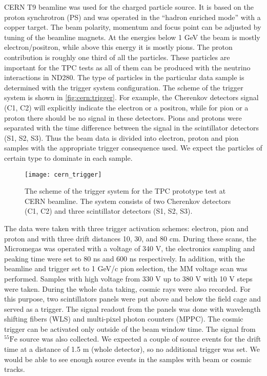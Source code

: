 \documentclass[../main.tex]{subfiles}
\begin{document}
CERN T9 beamline was used for the charged particle source. It is based on the proton synchrotron (PS) and was operated in the ``hadron enriched mode'' with a copper target. The beam polarity, momentum and focus point can be adjusted by tuning of the beamline magnets.
At the energies below 1 GeV the beam is mostly electron/positron, while above this energy it is mostly pions. The proton contribution is roughly one third of all the particles. These particles are important for the TPC tests as all of them can be produced with the neutrino interactions in ND280. The type of particles in the particular data sample is determined with the trigger system configuration. The scheme of the trigger system is shown in \autoref{fig:cern:trigger}.  For example, the Cherenkov detectors signal (C1, C2)  will explicitly indicate the electron or a positron, while for pion or a proton there should be no signal in these detectors. Pions and protons were separated with the time difference between the signal in the scintillator detectors (S1, S2, S3). Thus the beam data is divided into electron, proton and pion samples with the appropriate trigger consequence used. We expect the particles of certain type to dominate in each sample.

\begin{figure}[!ht]
   \centering
   \texttt{[image: cern\_trigger]}
   \caption{The scheme of the trigger system for the TPC prototype test at CERN beamline. The system consists of two Cherenkov detectors (C1, C2) and three scintillator detectors (S1, S2, S3).}
   \label{fig:cern:trigger}
 \end{figure}

The data were taken with three trigger activation schemes: electron, pion and proton and with three drift distances 10, 30, and 80 cm. During these scans, the Micromegas was operated with a voltage of 340 V, the electronics sampling and peaking time were set to 80 ns and 600 ns respectively. In addition, with the beamline and trigger set to 1 GeV/c pion selection, the MM voltage scan was performed. Samples with high voltage from 330 V up to 380 V with 10 V steps were taken. During the whole data taking, cosmic rays were also recorded. For this purpose, two scintillators panels were put above and below the field cage and served as a trigger. The signal readout from the panels was done with wavelength shifting fibers (WLS) and multi-pixel photon counters (MPPC). The cosmic trigger can be activated only outside of the beam window time. The signal from ${}^{55}\text{Fe}$ source was also collected. We expected a couple of source events for the drift time at a distance of 1.5 m (whole detector), so no additional trigger was set. We would be able to see enough source events in the samples with beam or cosmic tracks.
\end{document}
